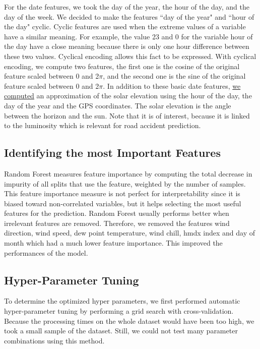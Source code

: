 \documentclass[conference]{IEEEtran}
\begin{document}
For the date features, we took the day of the year, the hour of the day,
and the day of the week. We decided to make the features ``day of the year"
and ``hour of the day" cyclic. Cyclic features are used when the extreme values
of a variable have a similar meaning. For example, the value 23 and 0 for
the variable hour of the day have a close meaning because there is only one
hour difference between these two values. Cyclical encoding allows this fact to be expressed.
With cyclical encoding, we compute two features, the first one is
the cosine of the original feature scaled between 0 and 2$\pi$, and the second
one is the sine of the original feature scaled between 0 and 2$\pi$.
In addition to these basic date features, \href{https://github.com/big-data-lab-team/accident-prediction-montreal/blob/master/src/solar\_features.py}{we computed} an approximation
of the solar elevation using the hour of the day, the day of the year
and the GPS coordinates. The solar elevation is the angle 
between the horizon and the sun. Note that it is of interest, because it is
linked to the luminosity which is relevant for road accident prediction.

\subsection{Identifying the most Important Features}

Random Forest measures feature importance by computing the total
decrease in impurity of all splits that use the feature, weighted by the
number of samples. This feature importance measure is not perfect for
interpretability since it is biased toward non-correlated variables, but it
helps selecting the most useful features for the prediction. 
Random Forest usually performs better when irrelevant features are removed.
Therefore, we removed the features wind direction, wind speed, dew
point temperature, wind chill, hmdx index and day of month which had a
much lower feature importance. This improved the performances of the model.

\subsection{Hyper-Parameter Tuning}

To determine the optimized hyper parameters, we first performed
automatic hyper-parameter tuning by performing a grid search 
with cross-validation. Because the processing times on the whole dataset would
have been too high, we took a small sample of the dataset. Still, we could
not test many parameter combinations using this method.
\end{document}
